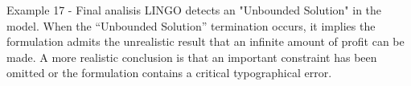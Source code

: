 \begin{frame}{Example 17 - Final analisis}
LINGO detects an "Unbounded Solution" in the model.
When the “Unbounded Solution” termination occurs, it implies the formulation
admits the unrealistic result  that an infinite amount of profit can be made. A more
realistic conclusion is that an important  constraint has been omitted or the
formulation contains a critical typographical error.
\end{frame}
